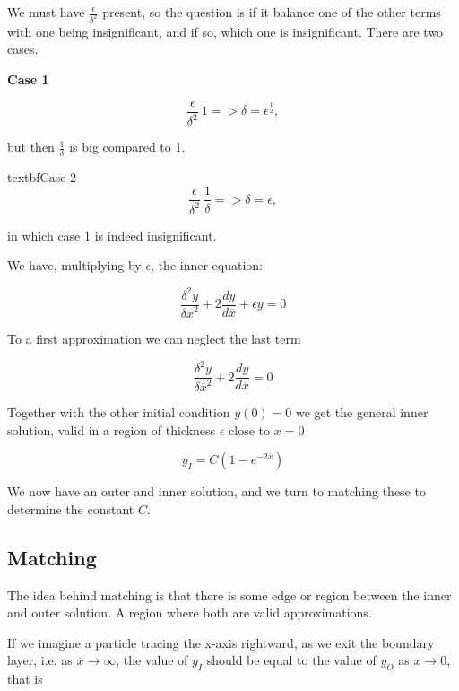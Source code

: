\documentclass[12pt]{article}
\begin{document}
We must have $\frac{\epsilon}{\delta^2}$ present, so the question is if it
balance one of the other terms with one being insignificant, and if so, which one
is insignificant. There are two cases.

\textbf{Case 1}

\begin{equation}
\frac{\epsilon}{\delta^2} ~ 1 => \delta = \epsilon^{\frac{1}{2}},
\end{equation}

but then $\frac{1}{\delta}$ is big compared to 1.

textbf{Case 2}
\begin{equation}
\frac{\epsilon}{\delta^2} ~ \frac{1}{\delta} => \delta = \epsilon,
\end{equation}

in which case 1 is indeed insignificant.

We have, multiplying by $\epsilon$, the inner equation:

\begin{equation}
\frac{\delta^2 y}{\delta \overline{x}^2} + 2 \frac{dy}{d\overline{x}} + \epsilon
y = 0
\end{equation}

To a first approximation we can neglect the last term

\begin{equation}
\frac{\delta^2 y}{\delta \overline{x}^2} + 2 \frac{dy}{d\overline{x}} = 0
\end{equation}

Together with the other initial condition $y(0)=0$ we get the general inner
solution, valid in a region of thickness $\epsilon$ close to $x=0$

\begin{equation}
y_I = C(1 - e^{-2\overline{x}})
\end{equation}

We now have an outer and inner solution, and we turn to matching these to
determine the constant $C$.

\subsection{Matching}

The idea behind matching is that there is some edge or region between the inner
and outer solution. A region where both are valid approximations.

If we imagine a particle tracing the x-axis rightward, as we exit the boundary
layer, i.e. as $\overline{x} \to \infty$, the value of $y_I$ should be equal to
the value of $y_O$ as $x \to 0$, that is
\end{document}
